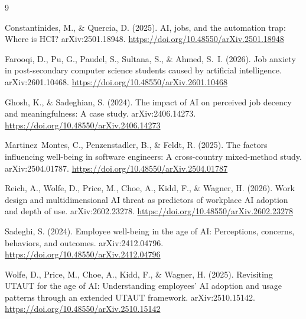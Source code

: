 \documentclass[11pt]{article}
\begin{document}

\begin{thebibliography}{9}

Constantinides, M., \& Quercia, D. (2025).
\newblock AI, jobs, and the automation trap: Where is HCI?
\newblock arXiv:2501.18948. \url{https://doi.org/10.48550/arXiv.2501.18948}

Farooqi, D., Pu, G., Paudel, S., Sultana, S., \& Ahmed, S.~I. (2026).
\newblock Job anxiety in post-secondary computer science students caused by
  artificial intelligence.
\newblock arXiv:2601.10468. \url{https://doi.org/10.48550/arXiv.2601.10468}

Ghosh, K., \& Sadeghian, S. (2024).
\newblock The impact of AI on perceived job decency and meaningfulness: A case
  study.
\newblock arXiv:2406.14273. \url{https://doi.org/10.48550/arXiv.2406.14273}

Martinez~Montes, C., Penzenstadler, B., \& Feldt, R. (2025).
\newblock The factors influencing well-being in software engineers: A
  cross-country mixed-method study.
\newblock arXiv:2504.01787. \url{https://doi.org/10.48550/arXiv.2504.01787}

Reich, A., Wolfe, D., Price, M., Choe, A., Kidd, F., \& Wagner, H. (2026).
\newblock Work design and multidimensional AI threat as predictors of workplace
  AI adoption and depth of use.
\newblock arXiv:2602.23278. \url{https://doi.org/10.48550/arXiv.2602.23278}

Sadeghi, S. (2024).
\newblock Employee well-being in the age of AI: Perceptions, concerns,
  behaviors, and outcomes.
\newblock arXiv:2412.04796. \url{https://doi.org/10.48550/arXiv.2412.04796}

Wolfe, D., Price, M., Choe, A., Kidd, F., \& Wagner, H. (2025).
\newblock Revisiting UTAUT for the age of AI: Understanding employees' AI
  adoption and usage patterns through an extended UTAUT framework.
\newblock arXiv:2510.15142. \url{https://doi.org/10.48550/arXiv.2510.15142}

\end{thebibliography}
\end{document}

